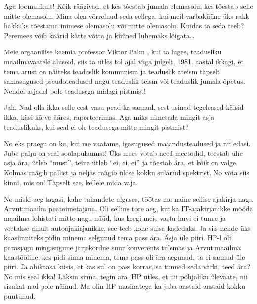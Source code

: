 
Aga loomulikult! Kõik räägivad, et kes tõestab jumala olemasolu, kes tõestab selle mitte olemasolu. Mina olen võrrelnud seda sellega, kui meil varbaküüne üks rakk hakkaks tõestama inimese olemasolu või mitte olemasolu. Kuidas ta seda teeb? Peremees võib käärid kätte võtta ja küüned lühemaks lõigata\ldots

Meie orgaanilise keemia professor Viktor Palm , kui ta luges,  teadusliku maailmavaatele aluseid, siis ta ütles tol ajal väga julgelt,  1981. aastal ikkagi, et tema arust on näiteks teaduslik kommunism ja teaduslik ateism täpselt samasugused pseudoteadused nagu teaduslik teism või teaduslik jumala-õpetus. Nendel asjadel pole teadusega midagi pistmist!
                 

Jah. Nad olla ikka selle eest vasu pead ka saanud, sest usinad tegeleased käisid ikka, käsi kõrva ääres, raporteerimas. Aga miks nimetada mingit asja teaduslikuks, kui seal ei ole teadusega mitte mingit pistmist?
                 

No eks  praegu on ka, kui me vaatame, igasugused majandusteadused ja nii edasi. Jube palju on seal soolapuhumist! Üks mees võtab need meetodid, tõestab ühe asja ära, ütleb \enquote{must}, teine ütleb \enquote{ei, ei, ei} ja tõestab ära, et kõik on valge. Kolmas räägib pallist ja neljas räägib üldse kokku sulanud spektrist. No võta siis kinni, mis on! Täpselt see, kellele mida vaja.
                 

No miski aeg tagasi, kahe tuhandete alguses, töötas mu naine sellise ajakirja nagu Arvutimaailm peatoimetajana. Oli selline tore aeg, kui ka IT-ajakirjanikke  mööda maailma lohistati mitte nagu nüüd, kus  keegi meie vastu huvi ei tunne ja veetakse ainult autoajakirjanikke, see teeb kohe suisa kadedaks. Ja siis nende üks kaasünniteks pidin minema selgunud tema pass ära. Äsja üle piiri. HP-l oli parasjagu mingisugune järjekordne suur konverents tulemas ja Arvutimaailma kaastööline, kes pidi sinna minema, tema pass oli ära aegunud, ta ei saanud üle piiri. Ja abikaasa küsis, et kas sul on pass korras, sa tunned seda värki, teed ära? No mis seal ikka! Läksin sinna, tegin ära. HP ütles, et nii põhjaliku ülevaate, nii sisukat nad pole näinud. Ma olin HP masinatega ka juba aastaid aastaid kokku puutunud. 

